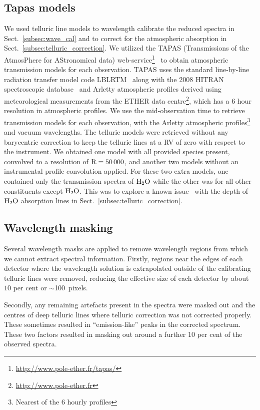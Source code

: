 \documentclass[fleqn,usenatbib]{mnras}
\begin{document}
\subsection{Tapas models}
\label{subsec:tapas_models}
We used telluric line models to wavelength calibrate the reduced spectra in Sect.~\ref{subsec:wave_cal} and to correct for the atmospheric absorption in Sect.~\ref{subsec:telluric_correction}. We utilized the TAPAS (Transmissions of the AtmosPhere for AStronomical data) web-service\footnote{\url{http://www.pole-ether.fr/tapas/}}~\citep{bertaux_tapas_2014} to obtain atmospheric transmission models for each observation. TAPAS uses the standard line-by-line radiation transfer model code LBLRTM~\citep{clough_linebyline_1995} along with the 2008 HITRAN spectroscopic database~\citep{rothman_hitran_2009} and Arletty atmospheric profiles derived using meteorological measurements from the ETHER data centre\footnote{\url{http://www.pole-ether.fr}}, which has a 6 hour resolution in atmospheric profiles.
We use the mid-observation time to retrieve transmission models for each observation, with the Arletty atmospheric profiles\footnote{Nearest of the 6 hourly profiles} and vacuum wavelengths. The telluric models were retrieved without any barycentric correction to keep the telluric lines at a RV of zero with respect to the instrument. We obtained one model with all provided species present, convolved to a resolution of \(\rm R=50\,000\), and another two models without an instrumental profile convolution applied. For these two extra models, one contained only the transmission spectra of \(\rm H_{2}O\) while the other was for all other constituents except \(\rm H_{2}O\). This was to explore a known issue~\citep{bertaux_tapas_2014} with the depth of \(\rm H_{2}O\) absorption lines in Sect.~\ref{subsec:telluric_correction}.

\subsection{Wavelength masking}
Several wavelength masks are applied to remove wavelength regions from which we cannot extract spectral information.
Firstly, regions near the edges of each detector where the wavelength solution is extrapolated outside of the calibrating telluric lines were removed, reducing the effective size of each detector by about \(10\) per cent or \(\sim\)100~pixels.

Secondly, any remaining artefacts present in the spectra were masked out and the centres of deep telluric lines where telluric correction was not corrected properly. These sometimes resulted in ``emission-like'' peaks in the corrected spectrum. These two factors resulted in masking out around a further 10 per cent of the observed spectra.
\end{document}
